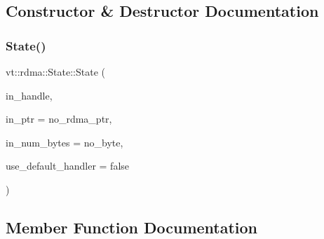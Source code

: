 \subsection{Constructor \& Destructor Documentation}
\mbox{\label{structvt_1_1rdma_1_1_state_a7ab4e08a915e4b8357e8f079844c9378}} 
\subsubsection{\texorpdfstring{State()}{State()}}
{\footnotesize\ttfamily vt\+::rdma\+::\+State\+::\+State (\begin{DoxyParamCaption}\item[{\hyperlink{namespacevt_a10442579ec4e7ebef223818e64bcf908}{R\+D\+M\+A\+\_\+\+Handle\+Type} const \&}]{in\+\_\+handle,  }\item[{\hyperlink{namespacevt_a9e2c953286c7616f7c218e9951790776}{R\+D\+M\+A\+\_\+\+Ptr\+Type} const \&}]{in\+\_\+ptr = {\ttfamily no\+\_\+rdma\+\_\+ptr},  }\item[{\hyperlink{namespacevt_aab8d55968084610ce3b17057981e9300}{Byte\+Type} const \&}]{in\+\_\+num\+\_\+bytes = {\ttfamily no\+\_\+byte},  }\item[{bool const \&}]{use\+\_\+default\+\_\+handler = {\ttfamily false} }\end{DoxyParamCaption})}



\subsection{Member Function Documentation}
\mbox{\label{structvt_1_1rdma_1_1_state_a1bf31d5a7099c678a004b12e374ad220}} 
